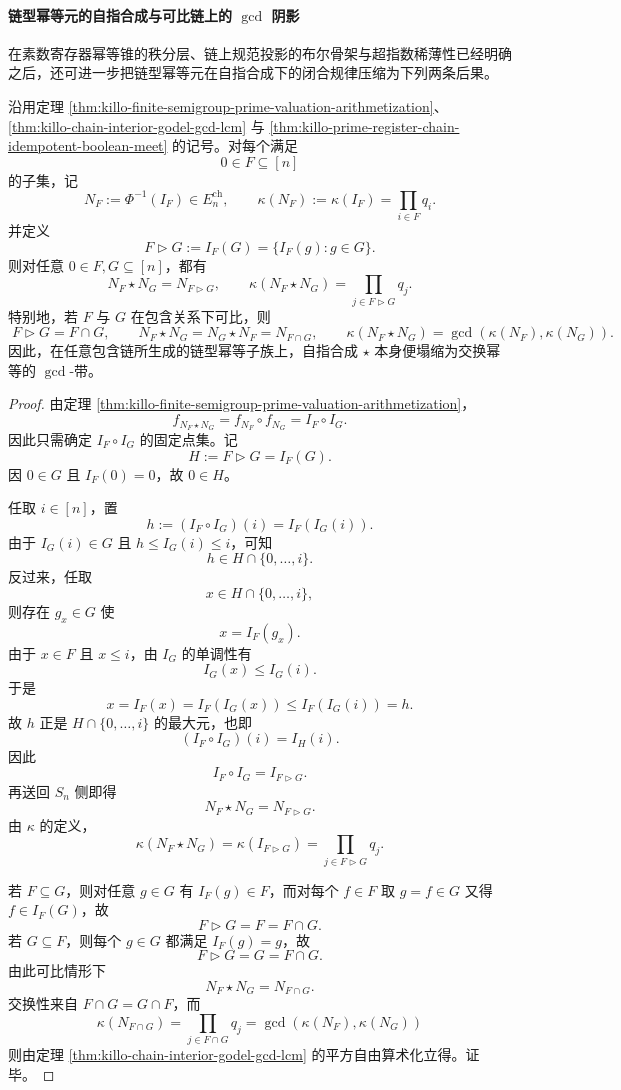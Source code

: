 \paragraph{链型幂等元的自指合成与可比链上的 \texorpdfstring{$\gcd$}{gcd} 阴影}
在素数寄存器幂等锥的秩分层、链上规范投影的布尔骨架与超指数稀薄性已经明确之后，还可进一步把链型幂等元在自指合成下的闭合规律压缩为下列两条后果。

\begin{theorem}\label{thm:xi-chain-idempotent-star-saturation-comparable-gcd}
沿用定理 \ref{thm:killo-finite-semigroup-prime-valuation-arithmetization}、
\ref{thm:killo-chain-interior-godel-gcd-lcm} 与
\ref{thm:killo-prime-register-chain-idempotent-boolean-meet} 的记号。对每个满足
\[
0\in F\subseteq [n]
\]
的子集，记
\[
N_F:=\Phi^{-1}(I_F)\in E_n^{\mathrm{ch}},
\qquad
\kappa(N_F):=\kappa(I_F)=\prod_{i\in F}q_i.
\]
并定义
\[
F\triangleright G:=I_F(G)=\{I_F(g):g\in G\}.
\]
则对任意 \(0\in F,G\subseteq[n]\)，都有
\[
\boxed{\;
N_F\star N_G=N_{F\triangleright G},
\qquad
\kappa(N_F\star N_G)=\prod_{j\in F\triangleright G}q_j.\;}
\]
特别地，若 \(F\) 与 \(G\) 在包含关系下可比，则
\[
\boxed{\;
F\triangleright G=F\cap G,\qquad
N_F\star N_G=N_G\star N_F=N_{F\cap G},\qquad
\kappa(N_F\star N_G)=\gcd(\kappa(N_F),\kappa(N_G)).\;}
\]
因此，在任意包含链所生成的链型幂等子族上，自指合成 \(\star\) 本身便塌缩为交换幂等的 \(\gcd\)-带。
\end{theorem}
\begin{proof}
由定理 \ref{thm:killo-finite-semigroup-prime-valuation-arithmetization}，
\[
f_{N_F\star N_G}=f_{N_F}\circ f_{N_G}=I_F\circ I_G.
\]
因此只需确定 \(I_F\circ I_G\) 的固定点集。记
\[
H:=F\triangleright G=I_F(G).
\]
因 \(0\in G\) 且 \(I_F(0)=0\)，故 \(0\in H\)。

任取 \(i\in[n]\)，置
\[
h:=(I_F\circ I_G)(i)=I_F(I_G(i)).
\]
由于 \(I_G(i)\in G\) 且 \(h\le I_G(i)\le i\)，可知
\[
h\in H\cap\{0,\dots,i\}.
\]
反过来，任取
\[
x\in H\cap\{0,\dots,i\},
\]
则存在 \(g_x\in G\) 使
\[
x=I_F(g_x).
\]
由于 \(x\in F\) 且 \(x\le i\)，由 \(I_G\) 的单调性有
\[
I_G(x)\le I_G(i).
\]
于是
\[
x=I_F(x)=I_F(I_G(x))\le I_F(I_G(i))=h.
\]
故 \(h\) 正是 \(H\cap\{0,\dots,i\}\) 的最大元，也即
\[
(I_F\circ I_G)(i)=I_H(i).
\]
因此
\[
I_F\circ I_G=I_{F\triangleright G}.
\]
再送回 \(S_n\) 侧即得
\[
N_F\star N_G=N_{F\triangleright G}.
\]
由 \(\kappa\) 的定义，
\[
\kappa(N_F\star N_G)=\kappa(I_{F\triangleright G})=\prod_{j\in F\triangleright G}q_j.
\]

若 \(F\subseteq G\)，则对任意 \(g\in G\) 有 \(I_F(g)\in F\)，而对每个 \(f\in F\) 取 \(g=f\in G\) 又得 \(f\in I_F(G)\)，故
\[
F\triangleright G=F=F\cap G.
\]
若 \(G\subseteq F\)，则每个 \(g\in G\) 都满足 \(I_F(g)=g\)，故
\[
F\triangleright G=G=F\cap G.
\]
由此可比情形下
\[
N_F\star N_G=N_{F\cap G}.
\]
交换性来自 \(F\cap G=G\cap F\)，而
\[
\kappa(N_{F\cap G})=\prod_{j\in F\cap G}q_j=\gcd(\kappa(N_F),\kappa(N_G))
\]
则由定理 \ref{thm:killo-chain-interior-godel-gcd-lcm} 的平方自由算术化立得。证毕。
\end{proof}

